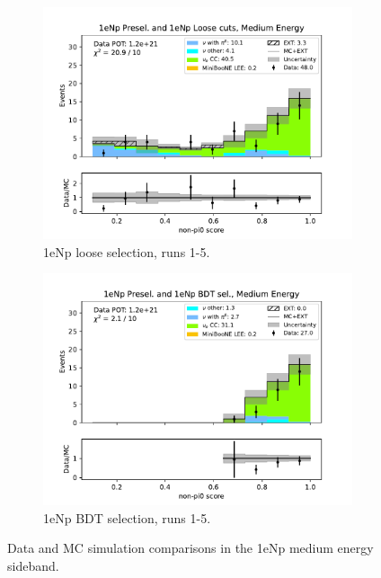 \begin{figure}[H]
\begin{subfigure}{0.33\linewidth}
        \includegraphics[width=\linewidth]{technote/Sidebands/Figures/NearSideband/near_sideband_nonpi0_score_run1234a4b4c4d5_NP_NPL_MEDIUM_ENERGY.pdf}
        \caption{1eNp loose selection, runs 1-5.}
    \end{subfigure}%
    \begin{subfigure}{0.33\linewidth}
        \includegraphics[width=\linewidth]{technote/Sidebands/Figures/NearSideband/near_sideband_nonpi0_score_run1234a4b4c4d5_NP_NPBDT_MEDIUM_ENERGY.pdf}
        \caption{1eNp BDT selection, runs 1-5.}
    \end{subfigure}
    \caption{Data and MC simulation comparisons in the 1eNp medium energy sideband.}
\end{figure}

